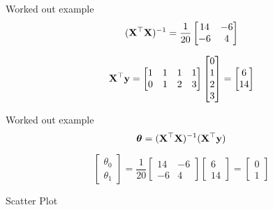 \documentclass{beamer}
\begin{document}
\begin{frame}{Worked out example}
    $$(\mathbf{X}^\top\mathbf{X})^{-1} = \frac{1}{20} \begin{bmatrix}
                14 & -6\\
                -6& 4
            \end{bmatrix}$$
            
    $$\mathbf{X}^\top\mathbf{y} = \begin{bmatrix}
            1&1&1&1\\
            0&1&2&3
            \end{bmatrix}\begin{bmatrix}
            0\\1\\2\\3
            \end{bmatrix}=\begin{bmatrix}
                6\\
                14
            \end{bmatrix}$$
\end{frame}


\begin{frame}{Worked out example}
    $$\boldsymbol{\theta} = (\mathbf{X}^\top\mathbf{X})^{-1}(\mathbf{X}^\top\mathbf{y})$$
    
    $$\begin{bmatrix}
        \theta_{0}\\
        \theta_{1}
    \end{bmatrix} = \frac{1}{20} \begin{bmatrix}
    14 & -6\\
    -6& 4
    \end{bmatrix}\begin{bmatrix}
    6\\
    14
    \end{bmatrix} =
    \begin{bmatrix}
        0\\
        1
    \end{bmatrix}$$
\end{frame}

\begin{frame}{Scatter Plot}


\end{frame}
\end{document}
